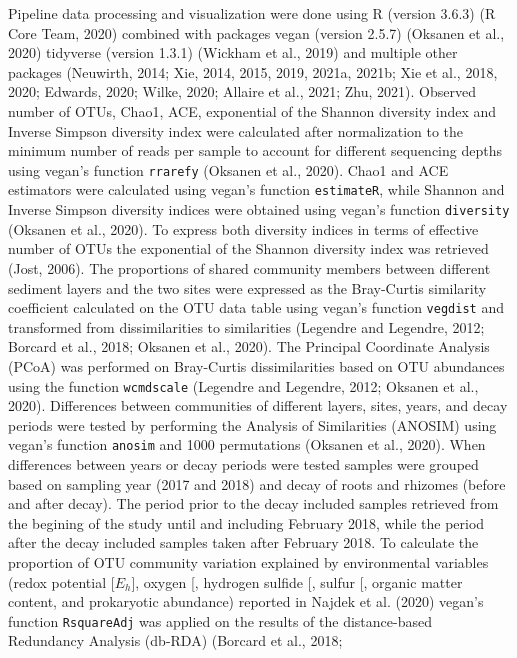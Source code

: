 \documentclass[12pt,]{article}
\begin{document}
Pipeline data processing and visualization were done using R (version
3.6.3) (R Core Team, 2020) combined with packages vegan (version 2.5.7)
(Oksanen et al., 2020) tidyverse (version 1.3.1) (Wickham et al., 2019)
and multiple other packages (Neuwirth, 2014; Xie, 2014, 2015, 2019,
2021a, 2021b; Xie et al., 2018, 2020; Edwards, 2020; Wilke, 2020;
Allaire et al., 2021; Zhu, 2021). Observed number of OTUs, Chao1, ACE,
exponential of the Shannon diversity index and Inverse Simpson diversity
index were calculated after normalization to the minimum number of reads
per sample to account for different sequencing depths using vegan's
function \texttt{rrarefy} (Oksanen et al., 2020). Chao1 and ACE
estimators were calculated using vegan's function \texttt{estimateR},
while Shannon and Inverse Simpson diversity indices were obtained using
vegan's function \texttt{diversity} (Oksanen et al., 2020). To express
both diversity indices in terms of effective number of OTUs the
exponential of the Shannon diversity index was retrieved (Jost, 2006).
The proportions of shared community members between different sediment
layers and the two sites were expressed as the Bray-Curtis similarity
coefficient calculated on the OTU data table using vegan's function
\texttt{vegdist} and transformed from dissimilarities to similarities
(Legendre and Legendre, 2012; Borcard et al., 2018; Oksanen et al.,
2020). The Principal Coordinate Analysis (PCoA) was performed on
Bray-Curtis dissimilarities based on OTU abundances using the function
\texttt{wcmdscale} (Legendre and Legendre, 2012; Oksanen et al., 2020).
Differences between communities of different layers, sites, years, and
decay periods were tested by performing the Analysis of Similarities
(ANOSIM) using vegan's function \texttt{anosim} and 1000 permutations
(Oksanen et al., 2020). When differences between years or decay periods
were tested samples were grouped based on sampling year (2017 and 2018)
and decay of roots and rhizomes (before and after decay). The period
prior to the decay included samples retrieved from the begining of the
study until and including February 2018, while the period after the
decay included samples taken after February 2018. To calculate the
proportion of OTU community variation explained by environmental
variables (redox potential {[}\(E_h\){]}, oxygen {[}\ch{O2}{]}, hydrogen
sulfide {[}\ch{H2S}{]}, sulfur {[}\ch{S^0}{]}, organic matter content,
and prokaryotic abundance) reported in Najdek et al. (2020) vegan's
function \texttt{RsquareAdj} was applied on the results of the
distance-based Redundancy Analysis (db-RDA) (Borcard et al., 2018;
\end{document}
